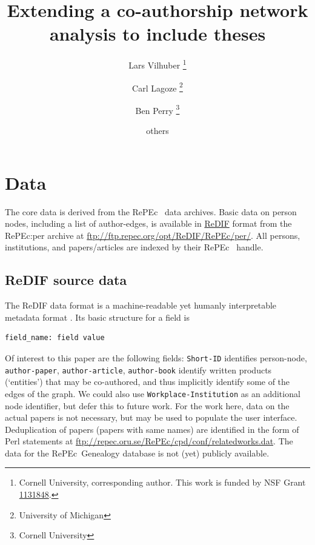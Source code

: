 \documentclass[x11names]{article}
\title{Extending a co-authorship network analysis to include theses}
\author{Lars Vilhuber%
\footnote{Cornell University, corresponding author. This work is funded by NSF Grant \href{http://www.nsf.gov/awardsearch/showAward.do?AwardNumber=1131848}{1131848}.}
\and Carl Lagoze%
\footnote{University of Michigan}
\and Ben Perry%
\footnote{Cornell University}
\and others
}
\newcommand{\repec}{RePEc}
\begin{document}
\maketitle
\providecommand{\cmark}[2][]{\relax} 
%

\section{Data}
\label{sec:data}
The core data is derived from the \repec~ data archives. Basic data on person nodes, including a list of author-edges,  is available in \href{http://openlib.org/acmes/root/docu/redif_1.html}{ReDIF} \cite{RePEc:rpc:rdfdoc:redif} format from the \repec :per archive at \url{ftp://ftp.repec.org/opt/ReDIF/RePEc/per/}. All persons, institutions, and papers/articles are indexed by their \repec~ handle. 

\subsection{ReDIF source data}
The ReDIF data format is a machine-readable yet humanly interpretable metadata format \cite{RePEc:rpc:rdfdoc:redif}. Its basic structure for a field is 
\begin{lstlisting}
field_name: field value
\end{lstlisting}
Of interest to this paper are the following fields: \lstinline|Short-ID| identifies person-node, \lstinline|author-paper|, \lstinline|author-article|, \lstinline|author-book| identify written products (`entities') that may be co-authored, and thus implicitly identify some of the edges of the graph. We could also use \lstinline|Workplace-Institution| as an additional node identifier, but defer this to future work. For the work here, data on the actual papers is not necessary, but may be used to populate the user interface. Deduplication of papers (papers with same names) are identified in the form of Perl statements at \url{ftp://repec.oru.se/RePEc/cpd/conf/relatedworks.dat}. The data for the \repec~Genealogy database is not (yet) publicly available.
\end{document}
